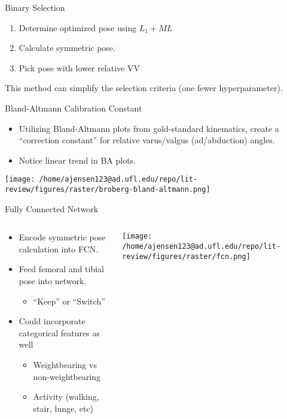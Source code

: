 \documentclass[presentation, aspectratio=1610]{beamer}
\begin{document}
\begin{frame}[label={sec:org236f094}]{Binary Selection}
\begin{enumerate}
\item Determine optimized pose using \(L_1 + ML\)
\item Calculate symmetric pose.
\item Pick pose with lower relative VV
\end{enumerate}

This method can simplify the selection criteria (one fewer hyperparameter).
\end{frame}
\begin{frame}[label={sec:orgfa27138}]{Bland-Altmann Calibration Constant}
\begin{itemize}
\item Utilizing Bland-Altmann plots from gold-standard kinematics, create a ``correction constant'' for relative varus/valgus (ad/abduction) angles.
\item Notice linear trend in BA plots.
\end{itemize}
\begin{center}
\texttt{[image: /home/ajensen123@ad.ufl.edu/repo/lit-review/figures/raster/broberg-bland-altmann.png]}
\end{center}
\end{frame}
\begin{frame}[label={sec:orgc1bd81a}]{Fully Connected Network}
\begin{columns}
\begin{column}{0.5\columnwidth}
\begin{itemize}
\item Encode symmetric pose calculation into FCN.
\item Feed femoral and tibial \alert{\alert{pose}} into network.
\begin{itemize}
\item ``Keep'' or ``Switch''
\end{itemize}
\item Could incorporate categorical features as well
\begin{itemize}
\item Weightbearing vs non-weightbearing
\item Activity (walking, stair, lunge, etc)
\end{itemize}
\end{itemize}
\end{column}
\begin{column}{0.6\columnwidth}
\begin{center}
\texttt{[image: /home/ajensen123@ad.ufl.edu/repo/lit-review/figures/raster/fcn.png]}
\end{center}
\end{column}
\end{columns}
\end{frame}
\end{document}

